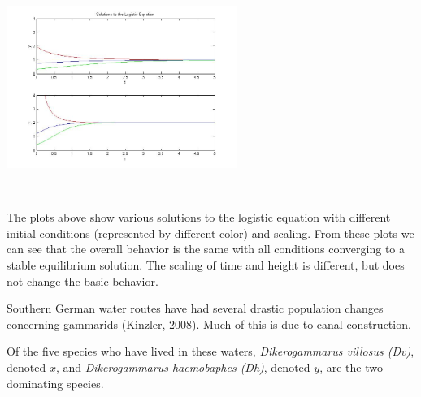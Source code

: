 \documentclass[landscape,final,a0paper,fontscale=0.285]{baposter}
\begin{document}
\begin{poster}
{\begin{center}\includegraphics[width=7.5cm,height=7cm]{img/ScalingofLogisticEqn} \end{center}

The plots above show various solutions to the logistic equation with different initial conditions (represented by different color) and scaling.  From these plots we can see that the overall behavior is the same with all conditions converging to a stable equilibrium solution. The scaling of time and height is different, but does not change the basic behavior. 
}
{
Southern German water routes have had several drastic population
changes concerning gammarids (Kinzler, 2008). Much of this is due to canal construction.

 Of the five species who have lived in these waters, \textit{Dikerogammarus villosus (Dv)}, denoted $x$, and \textit{Dikerogammarus haemobaphes (Dh)}, denoted $y$, are the two dominating species.

}
\end{poster}
\end{document}
